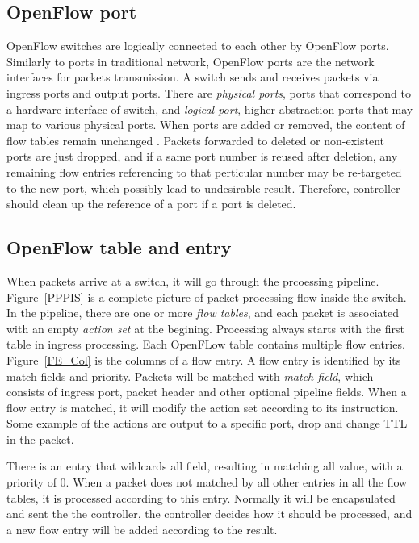 \subsection{OpenFlow port}
\label{OpenFlow port}
OpenFlow switches are logically connected to each other by OpenFlow ports. Similarly to ports in traditional network, OpenFlow ports are the network interfaces for packets transmission. A switch sends and receives packets via ingress ports and output ports. There are \textit{physical ports}, ports that correspond to a hardware interface of switch, and \textit{logical port}, higher abstraction ports that may map to various physical ports. When ports are added or removed, the content of flow tables remain unchanged
. Packets forwarded to deleted or non-existent ports are just dropped, and if a same port number is reused after deletion, any remaining flow entries referencing to that perticular number may be re-targeted to the new port, which possibly lead to undesirable result. Therefore, controller should clean up the reference of a port if a port is deleted. \cite{OF_SPEC}

\subsection{OpenFlow table and entry}
\label{OpenFlow table and entry}
When packets arrive at a switch, it will go through the prcoessing pipeline. Figure~\ref{PPPIS} is a complete picture of packet processing flow inside the switch. In the pipeline, there are one or more \textit{flow tables}, and each packet is associated with an empty \textit{action set} at the begining. Processing always starts with the first table in ingress processing. Each OpenFLow table contains multiple flow entries. Figure~\ref{FE_Col} is the columns of a flow entry. A flow entry is identified by its match fields and priority. Packets will be matched with \textit{match field}, which consists of ingress port, packet header and other optional pipeline fields. When a flow entry is matched, it will modify the action set according to its instruction. Some example of the actions are output to a specific port, drop and change TTL in the packet.

There is an entry that wildcards all field, resulting in matching all value, with a priority of 0. When a packet does not matched by all other entries in all the flow tables, it is processed according to this entry. Normally it will be encapsulated and sent the the controller, the controller decides how it should be processed, and a new flow entry will be added according to the result.

